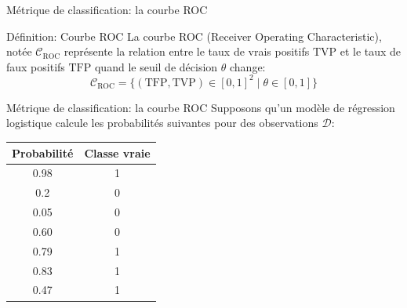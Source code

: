 \begin{frame}{Métrique de classification: la courbe ROC}
	\begin{block}{Définition: Courbe ROC}
		La courbe ROC (Receiver Operating Characteristic), notée $\mathcal{C}_{\text{ROC}}$ représente la relation entre le taux de vrais positifs $\text{TVP}$ et le taux de faux positifs $\text{TFP}$ quand le seuil de décision $\theta$ change:
		\begin{equation}
			\mathcal{C}_{\text{ROC}} = \{ \left(\text{TFP}, \text{TVP}\right) \in [0, 1]^2 \mid \theta \in [0, 1]\}
			\nonumber
		\end{equation}
	\end{block}
\end{frame}

\begin{frame}{Métrique de classification: la courbe ROC}
	Supposons qu'un modèle de régression logistique calcule les probabilités suivantes pour des observations $\mathcal{D}$:
	\begin{table}
		\centering
		\begin{tabular}{|c|c|}
			\hline
			\textbf{Probabilité} & \textbf{Classe vraie} \\ \hline
			0.98 & 1 \\ \hline
			0.2  & 0 \\ \hline
			0.05 & 0 \\ \hline
			0.60 & 0 \\ \hline
			0.79 & 1 \\ \hline
			0.83 & 1 \\ \hline
			0.47 & 1 \\ \hline
		\end{tabular}
	\end{table}
\end{frame}

